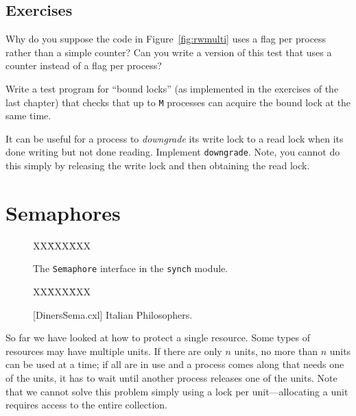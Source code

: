\documentclass{report}
\newcommand{\cxlsource}[1]{
\begin{tabbing}
XX\=XXX\=XXX\kill
    
\end{tabbing}
}
\newenvironment{code}{
\tcolorbox
}{
\endtcolorbox
}
\begin{document}
\section*{Exercises}
\begin{problems}
\item Why do you suppose the code in Figure~\ref{fig:rwmulti} uses a flag
per process rather than a simple counter?
Can you write a version of this test that uses a counter instead
of a flag per process?
\item Write a test program for ``bound locks'' (as implemented in the
exercises of the last chapter) that checks that up to \texttt{M} processes
can acquire the bound lock at the same time.
\item It can be useful for a process to \emph{downgrade} its write lock
to a read lock when its done writing but not done reading.  Implement
\texttt{downgrade}.  Note, you cannot do this simply by releasing the
write lock and then obtaining the read lock.
\end{problems}

\chapter{Semaphores}
\label{ch:semaphore}


\begin{figure}
\begin{code}
\cxlsource{semaphore}
\end{code}
\caption{The \texttt{Semaphore} interface in the \texttt{synch} module.}
\label{fig:semaphore}
\end{figure}

\begin{figure}
\begin{code}
\cxlsource{DinersSema}
\end{code}
\caption{[DinersSema.cxl] Italian Philosophers.}
\label{fig:dinerssema}
\end{figure}

So far we have looked at how to protect a single resource.
Some types of resources may have multiple units.
If there are only $n$ units, no more than $n$ units can be used at a time;
if all are in use and a process comes along that needs one of the units,
it has to wait until another process releases one of the units.
Note that we cannot solve this problem simply using a lock per unit---allocating
a unit requires access to the entire collection.
\end{document}
